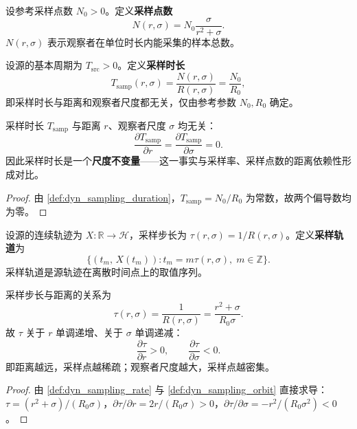 \begin{definition}[尺度相关采样点数]\label{def:dyn_sampling_points}
设参考采样点数 $N_0>0$。定义\textbf{采样点数}
\[
N(r,\sigma)=N_0\frac{\sigma}{r^2+\sigma}.
\]
$N(r,\sigma)$ 表示观察者在单位时长内能采集的样本总数。
\end{definition}

\begin{definition}[尺度相关采样时长]\label{def:dyn_sampling_duration}
设源的基本周期为 $T_{\text{src}}>0$。定义\textbf{采样时长}
\[
T_{\text{samp}}(r,\sigma)=\frac{N(r,\sigma)}{R(r,\sigma)}=\frac{N_0}{R_0},
\]
即采样时长与距离和观察者尺度都无关，仅由参考参数 $N_0,R_0$ 确定。
\end{definition}

\begin{proposition}[采样时长的不变性]\label{prop:dyn_sampling_duration_invariance}
采样时长 $T_{\text{samp}}$ 与距离 $r$、观察者尺度 $\sigma$ 均无关：
\[
\frac{\partial T_{\text{samp}}}{\partial r}=\frac{\partial T_{\text{samp}}}{\partial\sigma}=0.
\]
因此采样时长是一个\textbf{尺度不变量}——这一事实与采样率、采样点数的距离依赖性形成对比。
\end{proposition}

\begin{proof}
由 \cref{def:dyn_sampling_duration}，$T_{\text{samp}}=N_0/R_0$ 为常数，故两个偏导数均为零。
\end{proof}

\begin{definition}[采样轨道]\label{def:dyn_sampling_orbit}
设源的连续轨迹为 $X:\mathbb R\to\mathcal H$，采样步长为 $\tau(r,\sigma)=1/R(r,\sigma)$。定义\textbf{采样轨道}为
\[
\{(t_m,\,X(t_m)):t_m=m\tau(r,\sigma),\;m\in\mathbb Z\}.
\]
采样轨道是源轨迹在离散时间点上的取值序列。
\end{definition}

\begin{proposition}[采样轨道的格点间距]\label{prop:dyn_sampling_orbit_spacing}
采样步长与距离的关系为
\[
\tau(r,\sigma)=\frac{1}{R(r,\sigma)}=\frac{r^2+\sigma}{R_0\sigma}.
\]
故 $\tau$ 关于 $r$ 单调递增、关于 $\sigma$ 单调递减：
\[
\frac{\partial\tau}{\partial r}>0,\qquad
\frac{\partial\tau}{\partial\sigma}<0.
\]
即距离越远，采样点越稀疏；观察者尺度越大，采样点越密集。
\end{proposition}

\begin{proof}
由 \cref{def:dyn_sampling_rate} 与 \cref{def:dyn_sampling_orbit} 直接求导：$\tau=(r^2+\sigma)/(R_0\sigma)$，$\partial\tau/\partial r=2r/(R_0\sigma)>0$，$\partial\tau/\partial\sigma=-r^2/(R_0\sigma^2)<0$。
\end{proof}

